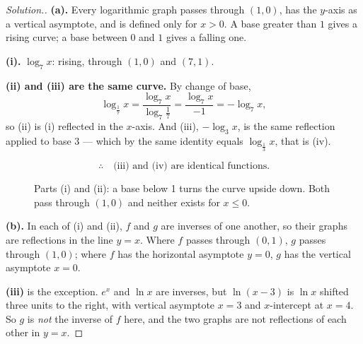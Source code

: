 \documentclass[11pt,a4paper]{article}
\theoremstyle{definition}
\newenvironment{solution}
  {\renewcommand{\qedsymbol}{}\begin{proof}[\textit{Solution}.]}
  {\end{proof}}
\begin{document}
\begin{solution}
\textbf{(a).} Every logarithmic graph passes through $(1,0)$, has the $y$-axis as a
vertical asymptote, and is defined only for $x>0$. A base greater than $1$ gives a
rising curve; a base between $0$ and $1$ gives a falling one.

\textbf{(i).} $\log_7 x$: rising, through $(1,0)$ and $(7,1)$.

\textbf{(ii) and (iii) are the same curve.} By change of base,
$$\log_{\frac{1}{7}}x=\frac{\log_7 x}{\log_7\frac{1}{7}}=\frac{\log_7 x}{-1}
=-\log_7 x,$$
so (ii) is (i) reflected in the $x$-axis. And (iii), $-\log_3 x$, is the same reflection
applied to base $3$ --- which by the same identity equals $\log_{\frac{1}{3}}x$, that
is (iv).

$$\therefore\quad \text{(iii) and (iv) are identical functions.}$$

\begin{figure}[H]
\centering
{}
\caption{Parts (i) and (ii): a base below 1 turns the curve upside down. Both pass through $(1,0)$ and neither exists for $x\leq 0$.}
\end{figure}

\textbf{(b).} In each of (i) and (ii), $f$ and $g$ are inverses of one another, so their
graphs are reflections in the line $y=x$. Where $f$ passes through $(0,1)$, $g$ passes
through $(1,0)$; where $f$ has the horizontal asymptote $y=0$, $g$ has the vertical
asymptote $x=0$.

\textbf{(iii)} is the exception. $e^x$ and $\ln x$ are inverses, but $\ln(x-3)$ is
$\ln x$ shifted three units to the right, with vertical asymptote $x=3$ and
$x$-intercept at $x=4$. So $g$ is \emph{not} the inverse of $f$ here, and the two
graphs are not reflections of each other in $y=x$.


\end{solution}
\end{document}
